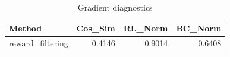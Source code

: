 \begin{table}[htbp]
\centering
\caption{Gradient diagnostics}
\label{tab:grad-diag}
\begin{tabular}{lrrr}
\toprule
\textbf{Method} & \textbf{Cos\_Sim} & \textbf{RL\_Norm} & \textbf{BC\_Norm} \\
\midrule
reward\_filtering & 0.4146 & 0.9014 & 0.6408 \\
\bottomrule
\end{tabular}
\end{table}